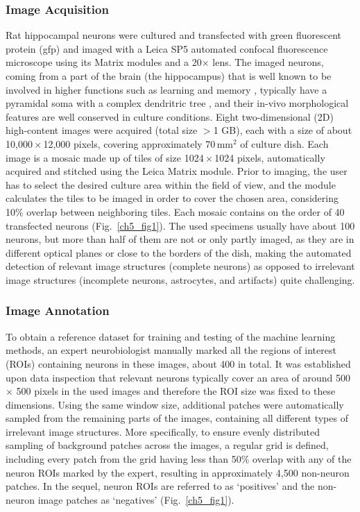 \subsubsection{Image Acquisition}
\label{sec:acquisition}
Rat hippocampal neurons were cultured and transfected with green fluorescent protein (\gls{gfp}) and imaged with a Leica SP5 automated confocal fluorescence microscope using its Matrix modules and a 20$\times$ lens. The imaged neurons, coming from a part of the brain (the hippocampus) that is well known to be involved in higher functions such as learning and memory \cite{squire1992memory}, typically have a pyramidal soma with a complex dendritric tree \cite{goslin1998rat}, and their in-vivo morphological features are well conserved in culture conditions. Eight two-dimensional (2D) high-content images were acquired (total size $>$1 GB), each with a size of about 10,000\,$\times$\,12,000 pixels, covering approximately 70\,mm${}^2$ of culture dish. Each image is a mosaic made up of tiles of size 1024\,$\times$\,1024 pixels, automatically acquired and stitched using the Leica Matrix module. Prior to imaging, the user has to select the desired culture area within the field of view, and the module calculates the tiles to be imaged in order to cover the chosen area, considering 10\% overlap between neighboring tiles. Each mosaic contains on the order of 40 transfected neurons (Fig.\ \ref{ch5_fig1}). The used specimens usually have about 100 neurons, but more than half of them are not or only partly imaged, as they are in different optical planes or close to the borders of the dish, making the automated detection of relevant image structures (complete neurons) as opposed to irrelevant image structures (incomplete neurons, astrocytes, and artifacts) quite challenging.

\subsubsection{Image Annotation}
\label{sec:annotation}
To obtain a reference dataset for training and testing of the machine learning methods, an expert neurobiologist manually marked all the regions of interest (ROIs) containing neurons in these images, about 400 in total. It was established upon data inspection that relevant neurons typically cover an area of around 500 $\times$ 500 pixels in the used images and therefore the ROI size was fixed to these dimensions. Using the same window size, additional patches were automatically sampled from the remaining parts of the images, containing all different types of irrelevant image structures. More specifically, to ensure evenly distributed sampling of background patches across the images, a regular grid is defined, including every patch from the grid having less than 50\% overlap with any of the neuron ROIs marked by the expert, resulting in approximately 4,500 non-neuron patches. In the sequel, neuron ROIs are referred to as `positives' and the non-neuron image patches as `negatives' (Fig.~\ref{ch5_fig1}).

